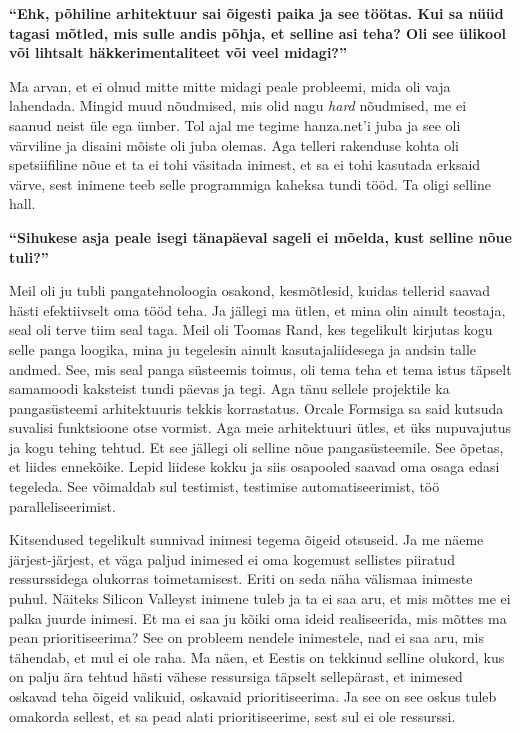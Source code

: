 \textbf{\enquote{Ehk, põhiline arhitektuur sai õigesti paika ja see töötas. Kui sa nüüd tagasi mõtled, mis sulle andis põhja, et selline asi teha? Oli see ülikool või lihtsalt häkkerimentaliteet või veel midagi?}}

Ma arvan, et ei olnud mitte mitte midagi peale probleemi, mida oli vaja lahendada. Mingid muud nõudmised, mis olid nagu \emph{hard} nõudmised, me ei saanud neist üle ega ümber. Tol ajal me tegime hanza.net'i juba ja see oli värviline ja disaini mõiste oli juba olemas. Aga telleri rakenduse kohta oli spetsiifiline nõue et ta ei tohi väsitada inimest, et sa ei tohi kasutada erksaid värve, sest inimene teeb selle programmiga kaheksa tundi tööd. Ta oligi selline hall.

\textbf{\enquote{Sihukese asja peale isegi tänapäeval sageli ei mõelda, kust selline nõue tuli?}}

Meil oli ju tubli pangatehnoloogia osakond, kesmõtlesid, kuidas tellerid saavad hästi efektiivselt oma tööd teha. Ja jällegi ma ütlen, et mina olin ainult teostaja, seal oli terve tiim seal taga. Meil oli Toomas Rand, kes tegelikult kirjutas kogu selle panga loogika, mina ju tegelesin ainult kasutajaliidesega ja andsin talle andmed. See, mis seal panga süsteemis toimus, oli tema teha et tema istus täpselt samamoodi kaksteist tundi päevas ja tegi. Aga tänu sellele projektile ka pangasüsteemi arhitektuuris tekkis korrastatus. Orcale Formsiga sa said kutsuda suvalisi funktsioone otse vormist. Aga meie arhitektuuri ütles, et üks nupuvajutus ja kogu tehing tehtud. Et see jällegi oli selline nõue pangasüsteemile. See õpetas, et liides ennekõike. Lepid liidese kokku ja siis osapooled saavad oma osaga  edasi tegeleda. See võimaldab sul testimist, testimise automatiseerimist, töö paralleliseerimist. 

Kitsendused tegelikult sunnivad inimesi tegema õigeid otsuseid. Ja me näeme järjest-järjest, et väga paljud inimesed ei oma kogemust sellistes piiratud  ressurssidega olukorras toimetamisest. Eriti on seda näha välismaa inimeste puhul. Näiteks Silicon Valleyst inimene tuleb ja ta ei saa aru, et mis mõttes me ei palka juurde inimesi. Et ma ei saa ju kõiki oma ideid realiseerida, mis mõttes ma pean prioritiseerima? See on probleem nendele inimestele, nad ei saa aru, mis tähendab, et mul ei ole raha. Ma näen, et Eestis on tekkinud selline olukord, kus on palju ära tehtud hästi vähese ressursiga täpselt sellepärast, et inimesed oskavad teha õigeid valikuid, oskavaid prioritiseerima. Ja see on see oskus tuleb omakorda sellest, et sa pead alati prioritiseerime, sest sul ei ole ressurssi.

